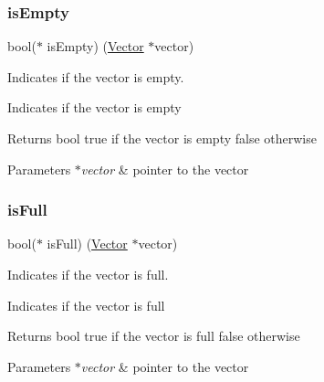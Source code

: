 \subsubsection{\texorpdfstring{is\+Empty}{isEmpty}}
{\footnotesize\ttfamily bool($\ast$ is\+Empty) (\hyperlink{structadt__vector__s}{Vector} $\ast$vector)}



Indicates if the vector is empty. 

Indicates if the vector is empty

\begin{DoxyReturn}{Returns}
bool true if the vector is empty false otherwise 
\end{DoxyReturn}

\begin{DoxyParams}{Parameters}
{\em $\ast$vector} & pointer to the vector \\
\hline
\end{DoxyParams}
\mbox{\label{structadt__vector__ops__s_a17540f18391f651604c7993572e7c6e3}} 
\subsubsection{\texorpdfstring{is\+Full}{isFull}}
{\footnotesize\ttfamily bool($\ast$ is\+Full) (\hyperlink{structadt__vector__s}{Vector} $\ast$vector)}



Indicates if the vector is full. 

Indicates if the vector is full

\begin{DoxyReturn}{Returns}
bool true if the vector is full false otherwise 
\end{DoxyReturn}

\begin{DoxyParams}{Parameters}
{\em $\ast$vector} & pointer to the vector \\
\hline
\end{DoxyParams}
\mbox{\label{structadt__vector__ops__s_a0f03e56076575c863902563b7b0c3d18}} 
